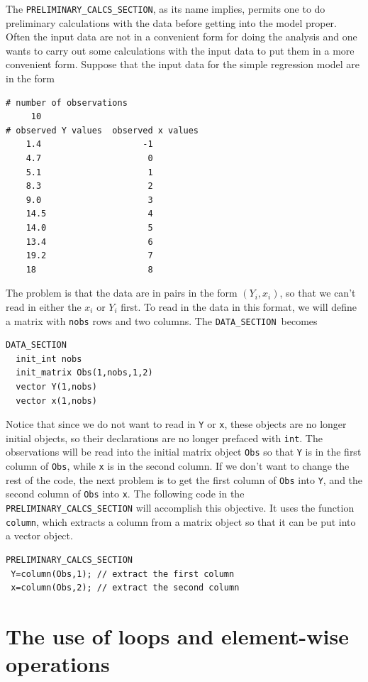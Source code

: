 \documentclass{admbmanual}
\newcommand\DS{\texttt{DATA\_SECTION}}
\begin{document}
The \texttt{PRELIMINARY\_CALCS\_SECTION}, as its name implies,
permits one to do preliminary calculations with the data
before getting into
the model proper.  Often the input data are not in a convenient form
for doing the analysis and one wants to carry out some calculations with
the input data to put them in a more convenient form.
Suppose that the input data for the simple regression model are in the form
\begin{lstlisting}
# number of observations
     10
# observed Y values  observed x values
    1.4                    -1
    4.7                     0
    5.1                     1
    8.3                     2
    9.0                     3
    14.5                    4
    14.0                    5
    13.4                    6
    19.2                    7
    18                      8
\end{lstlisting}
The problem is that the data are in pairs in the 
form $(Y_i,x_i)$, so that we can't read in either the 
$x_i$ or $Y_i$ first.  To read in the data in this format, 
we will define a matrix  with \texttt{nobs} rows and two
columns.
The  \DS\ becomes
\begin{lstlisting}
DATA_SECTION
  init_int nobs
  init_matrix Obs(1,nobs,1,2) 
  vector Y(1,nobs)
  vector x(1,nobs)
\end{lstlisting}
Notice that since we do not want to read in \texttt{Y} or
\texttt{x}, these objects are no longer initial objects, so their
declarations are no longer prefaced with \texttt{int}. 
The observations will be read into the initial matrix object \texttt{Obs}
so that \texttt{Y}  is in the first column of \texttt{Obs}, while
\texttt{x} is in the second column.
If we don't want to change the rest of the code, the next problem is to
get the first column of \texttt{Obs} into \texttt{Y}, and the second column
of \texttt{Obs} into \texttt{x}.
The following code in the \texttt{PRELIMINARY\_CALCS\_SECTION}
will accomplish this objective. It uses the function \texttt{column},
which extracts a column from a matrix object so that it can be put into a
vector object. 
\begin{lstlisting}
PRELIMINARY_CALCS_SECTION
 Y=column(Obs,1); // extract the first column
 x=column(Obs,2); // extract the second column
\end{lstlisting}


\section{The use of loops and element-wise operations}
\end{document}
